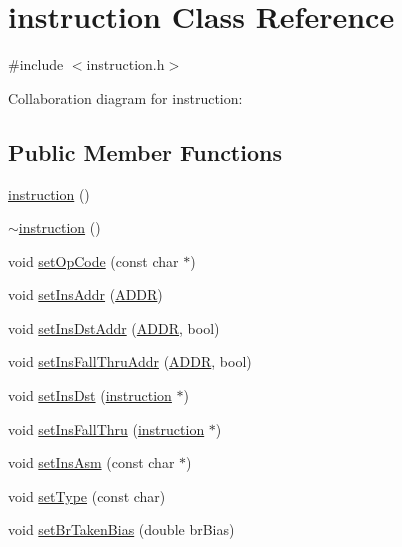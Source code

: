 \hypertarget{classinstruction}{
\section{instruction Class Reference}
\label{classinstruction}
}


{\ttfamily \#include $<$instruction.h$>$}



Collaboration diagram for instruction:
\subsection*{Public Member Functions}
\begin{DoxyCompactItemize}
\item 
\hyperlink{classinstruction_a2e0bfed549166dbfa1ce77ec084ea310}{instruction} ()
\item 
\hyperlink{classinstruction_a4f9c54b6376cf77565179728fa6f68fa}{$\sim$instruction} ()
\item 
void \hyperlink{classinstruction_a7a4adbec8d2e9a2cb6090168530e336c}{setOpCode} (const char $\ast$)
\item 
void \hyperlink{classinstruction_affb2525016712f3bac93120d4d81961d}{setInsAddr} (\hyperlink{binaryTranslator_2global_8h_a8bb6b77b3aab51e3a8d1866dd5861225}{ADDR})
\item 
void \hyperlink{classinstruction_a3ee6f1e5c349643f6734df78619c86f9}{setInsDstAddr} (\hyperlink{binaryTranslator_2global_8h_a8bb6b77b3aab51e3a8d1866dd5861225}{ADDR}, bool)
\item 
void \hyperlink{classinstruction_ab0119dd691b88e7cedb51d4f48c829a9}{setInsFallThruAddr} (\hyperlink{binaryTranslator_2global_8h_a8bb6b77b3aab51e3a8d1866dd5861225}{ADDR}, bool)
\item 
void \hyperlink{classinstruction_a7cd565022bab4e05dfe1e0b4637731d5}{setInsDst} (\hyperlink{classinstruction}{instruction} $\ast$)
\item 
void \hyperlink{classinstruction_afb8fdf4968223005eaf2eb18709f2ce5}{setInsFallThru} (\hyperlink{classinstruction}{instruction} $\ast$)
\item 
void \hyperlink{classinstruction_ae28df36b635c5359fa48a6476eebc425}{setInsAsm} (const char $\ast$)
\item 
void \hyperlink{classinstruction_aa6ff7d5323483cf18c10687ed8c1dc73}{setType} (const char)
\item 
void \hyperlink{classinstruction_aabc818127836c8403b9c691985ca6d14}{setBrTakenBias} (double brBias)

\end{DoxyCompactItemize}
